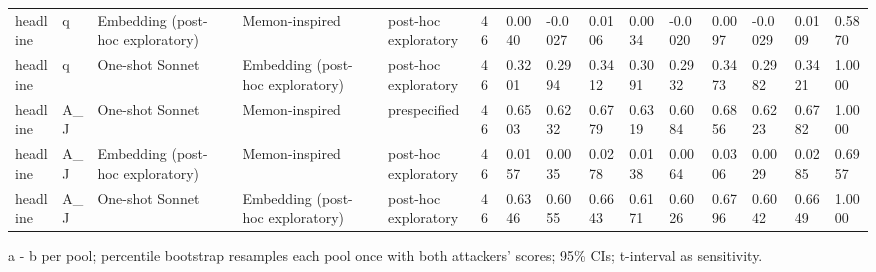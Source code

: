 \begin{table}[t]
{\begin{tabular}{lllllllllllllll}
headline & q & Embedding (post-hoc exploratory) & Memon-inspired & post-hoc exploratory & 46 & 0.0040 & -0.0027 & 0.0106 & 0.0034 & -0.0020 & 0.0097 & -0.0029 & 0.0109 & 0.5870 \\
headline & q & One-shot Sonnet & Embedding (post-hoc exploratory) & post-hoc exploratory & 46 & 0.3201 & 0.2994 & 0.3412 & 0.3091 & 0.2932 & 0.3473 & 0.2982 & 0.3421 & 1.0000 \\
headline & A\_J & One-shot Sonnet & Memon-inspired & prespecified & 46 & 0.6503 & 0.6232 & 0.6779 & 0.6319 & 0.6084 & 0.6856 & 0.6223 & 0.6782 & 1.0000 \\
headline & A\_J & Embedding (post-hoc exploratory) & Memon-inspired & post-hoc exploratory & 46 & 0.0157 & 0.0035 & 0.0278 & 0.0138 & 0.0064 & 0.0306 & 0.0029 & 0.0285 & 0.6957 \\
headline & A\_J & One-shot Sonnet & Embedding (post-hoc exploratory) & post-hoc exploratory & 46 & 0.6346 & 0.6055 & 0.6643 & 0.6171 & 0.6026 & 0.6796 & 0.6042 & 0.6649 & 1.0000 \\
\bottomrule
\end{tabular}}
\par\smallskip\parbox{\linewidth}{\tiny a - b per pool; percentile bootstrap resamples each pool once with both attackers' scores; 95\% CIs; t-interval as sensitivity.}
\end{table}
